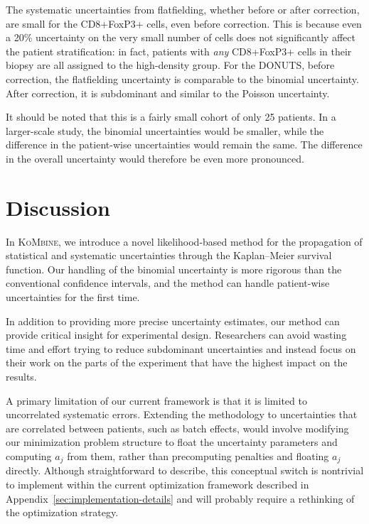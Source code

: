 \documentclass[pdflatex,sn-basic]{sn-jnl}%
\theoremstyle{thmstyleone}%
\theoremstyle{thmstyletwo}%
\theoremstyle{thmstylethree}%
\newcommand{\KM}{Kaplan--Meier} %
\newcommand{\KoMbine}{\textsc{KoMbine}}
\begin{document}
The systematic uncertainties from flatfielding, whether before or after correction, are small for the CD8+FoxP3+ cells, even before correction.  This is because even a 20\% uncertainty on the very small number of cells does not significantly affect the patient stratification: in fact, patients with \emph{any} CD8+FoxP3+ cells in their biopsy are all assigned to the high-density group.  For the DONUTS, before correction, the flatfielding uncertainty is comparable to the binomial uncertainty.  After correction, it is subdominant and similar to the Poisson uncertainty.

It should be noted that this is a fairly small cohort of only 25 patients. In a larger-scale study, the binomial uncertainties would be smaller, while the difference in the patient-wise uncertainties would remain the same.  The difference in the overall uncertainty would therefore be even more pronounced.

\section{Discussion}

In \KoMbine{}, we introduce a novel likelihood-based method for the propagation of statistical and systematic uncertainties through the \KM{} survival function. Our handling of the binomial uncertainty is more rigorous than the conventional \citeauthor{Greenwood} confidence intervals, and the method can handle patient-wise uncertainties for the first time.

In addition to providing more precise uncertainty estimates, our method can provide critical insight for experimental design.  Researchers can avoid wasting time and effort trying to reduce subdominant uncertainties and instead focus on their work on the parts of the experiment that have the highest impact on the results.

A primary limitation of our current framework is that it is limited to uncorrelated systematic errors.  Extending the methodology to uncertainties that are correlated between patients, such as batch effects, would involve modifying our minimization problem structure to float the uncertainty parameters and computing \(a_j\) from them, rather than precomputing penalties and floating \(a_j\) directly.  Although straightforward to describe, this conceptual switch is nontrivial to implement within the current optimization framework described in Appendix~\ref{sec:implementation-details} and will probably require a rethinking of the optimization strategy.
\end{document}
